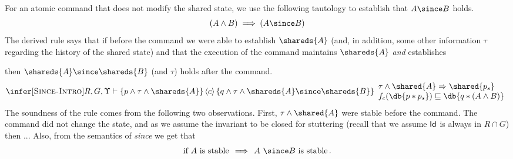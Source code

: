 For an atomic command that does not modify the 
shared state, we use the following tautology to establish 
that $A \since B$ holds.
\[
(A \wedge B) \implies (A \since B) 
\]
The derived rule says that if before the command we were able to
establish $\shareds{A}$ (and, in addition, some other information $\tau$ regarding the history of the shared state)
and that the execution of the command maintains $\shareds{A}$ \emph{and} establishes {
then $\shareds{A} \since \shareds{B}$ (and $\tau$) holds after the command.
\[
\infer[\textsc{Since-Intro}]{
R, G, \Upsilon \vdash 
\{p \wedge \tau \wedge \shareds{A} \}\, 
\langle c \rangle\, 
\{ q \wedge \tau \wedge   \shareds{A} \since \shareds{B} \} %
}{
\begin{array}{l}
\tau \wedge \shared{A}  \Rightarrow \shared{p_s}\\
f_c(\db{p * p_s}) \sqsubseteq \db{q * (A \land B)}
\\
\end{array}
}
\]
The soundness of the rule  comes from the following two observations.
First, $\tau \wedge \shared{A}$ were stable before the command.
The command did not change the state, and as we assume the invariant to be closed for stuttering
(recall that we assume ${\sf Id}$ is always in $R \cap G$) then ...
Also, from the semantics of \emph{since} we get that 
\[
\text{if}~A~\text{is stable}\,\implies\,A~\since B~\text{is stable}\,.
\]



}
